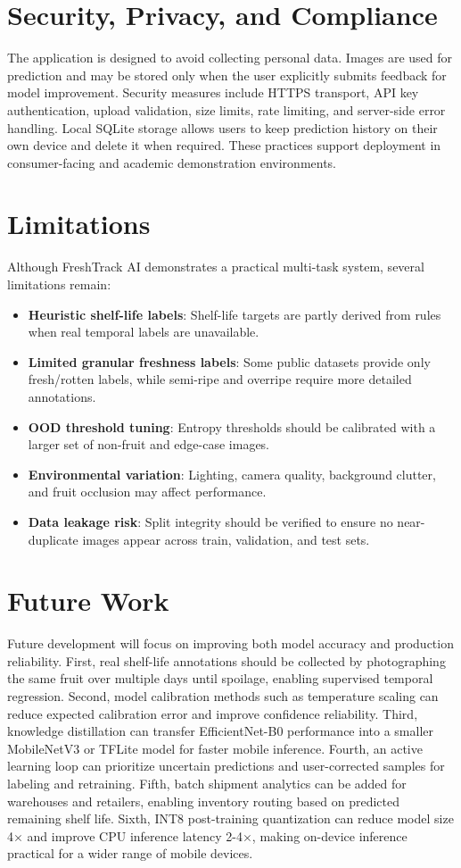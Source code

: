 \documentclass[conference]{IEEEtran}
\begin{document}
\section{Security, Privacy, and Compliance}
The application is designed to avoid collecting personal data. Images are used for prediction and may be stored only when the user explicitly submits feedback for model improvement. Security measures include HTTPS transport, API key authentication, upload validation, size limits, rate limiting, and server-side error handling. Local SQLite storage allows users to keep prediction history on their own device and delete it when required. These practices support deployment in consumer-facing and academic demonstration environments.

\section{Limitations}
Although FreshTrack AI demonstrates a practical multi-task system, several limitations remain:
\begin{itemize}
    \item \textbf{Heuristic shelf-life labels}: Shelf-life targets are partly derived from rules when real temporal labels are unavailable.
    \item \textbf{Limited granular freshness labels}: Some public datasets provide only fresh/rotten labels, while semi-ripe and overripe require more detailed annotations.
    \item \textbf{OOD threshold tuning}: Entropy thresholds should be calibrated with a larger set of non-fruit and edge-case images.
    \item \textbf{Environmental variation}: Lighting, camera quality, background clutter, and fruit occlusion may affect performance.
    \item \textbf{Data leakage risk}: Split integrity should be verified to ensure no near-duplicate images appear across train, validation, and test sets.
\end{itemize}

\section{Future Work}
Future development will focus on improving both model accuracy and production reliability. First, real shelf-life annotations should be collected by photographing the same fruit over multiple days until spoilage, enabling supervised temporal regression. Second, model calibration methods such as temperature scaling can reduce expected calibration error and improve confidence reliability. Third, knowledge distillation can transfer EfficientNet-B0 performance into a smaller MobileNetV3 or TFLite model for faster mobile inference. Fourth, an active learning loop can prioritize uncertain predictions and user-corrected samples for labeling and retraining. Fifth, batch shipment analytics can be added for warehouses and retailers, enabling inventory routing based on predicted remaining shelf life. Sixth, INT8 post-training quantization can reduce model size 4$\times$ and improve CPU inference latency 2-4$\times$, making on-device inference practical for a wider range of mobile devices.
\end{document}
